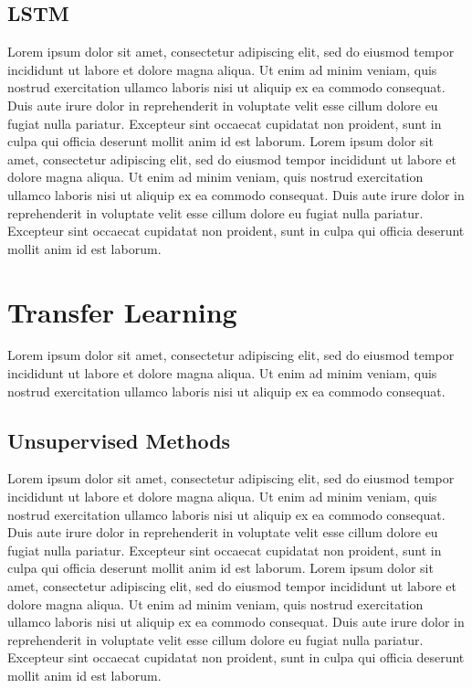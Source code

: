 \documentclass[12pt]{article}
\begin{document}
\subsection{LSTM}
Lorem ipsum dolor sit amet, consectetur adipiscing elit, sed do eiusmod tempor incididunt ut labore et dolore magna aliqua. Ut enim ad minim veniam, quis nostrud exercitation ullamco laboris nisi ut aliquip ex ea commodo consequat. Duis aute irure dolor in reprehenderit in voluptate velit esse cillum dolore eu fugiat nulla pariatur. Excepteur sint occaecat cupidatat non proident, sunt in culpa qui officia deserunt mollit anim id est laborum. Lorem ipsum dolor sit amet, consectetur adipiscing elit, sed do eiusmod tempor incididunt ut labore et dolore magna aliqua. Ut enim ad minim veniam, quis nostrud exercitation ullamco laboris nisi ut aliquip ex ea commodo consequat. Duis aute irure dolor in reprehenderit in voluptate velit esse cillum dolore eu fugiat nulla pariatur. Excepteur sint occaecat cupidatat non proident, sunt in culpa qui officia deserunt mollit anim id est laborum.

\section{Transfer Learning}
Lorem ipsum dolor sit amet, consectetur adipiscing elit, sed do eiusmod tempor incididunt ut labore et dolore magna aliqua. Ut enim ad minim veniam, quis nostrud exercitation ullamco laboris nisi ut aliquip ex ea commodo consequat.

\subsection{Unsupervised Methods}
Lorem ipsum dolor sit amet, consectetur adipiscing elit, sed do eiusmod tempor incididunt ut labore et dolore magna aliqua. Ut enim ad minim veniam, quis nostrud exercitation ullamco laboris nisi ut aliquip ex ea commodo consequat. Duis aute irure dolor in reprehenderit in voluptate velit esse cillum dolore eu fugiat nulla pariatur. Excepteur sint occaecat cupidatat non proident, sunt in culpa qui officia deserunt mollit anim id est laborum. Lorem ipsum dolor sit amet, consectetur adipiscing elit, sed do eiusmod tempor incididunt ut labore et dolore magna aliqua. Ut enim ad minim veniam, quis nostrud exercitation ullamco laboris nisi ut aliquip ex ea commodo consequat. Duis aute irure dolor in reprehenderit in voluptate velit esse cillum dolore eu fugiat nulla pariatur. Excepteur sint occaecat cupidatat non proident, sunt in culpa qui officia deserunt mollit anim id est laborum.
\end{document}

